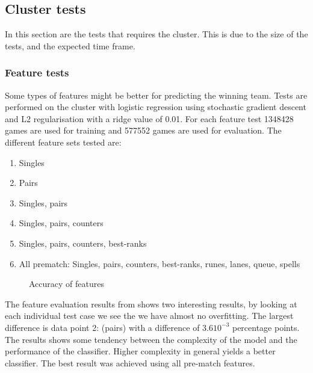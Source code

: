 \subsection{Cluster tests}\label{sec:clustertest}
In this section are the tests that requires the cluster. This is due to the size of the tests, and the expected time frame.
\subsubsection{Feature tests}\label{sec:feattest}
Some types of features might be better for predicting the winning team.
Tests are performed on the cluster with logistic regression using stochastic gradient descent and L2 regularisation with a ridge value of 0.01. 
For each feature test 1348428 games are used for training and 577552 games are used for evaluation. 
The different feature sets tested are:
\begin{enumerate}
\item Singles
\item Pairs
\item Singles, pairs
\item Singles, pairs, counters
\item Singles, pairs, counters, best-ranks
\item All prematch: Singles, pairs, counters, best-ranks, runes, lanes, queue, spells
\end{enumerate}

\begin{figure}[!htb]
  \centering
   \caption{Accuracy of features}\label{fig:cluster-feat}
\end{figure}

The feature evaluation results from  shows two interesting results, by looking at each individual test case we see the we have almost no overfitting. The largest difference is data point 2: (pairs) with a difference of $3.610^{-3}$ percentage points. The results shows some tendency between the complexity of the model and the performance of the classifier. Higher complexity in general yields a better classifier. The best result was achieved using all pre-match features.




